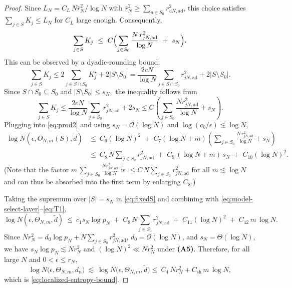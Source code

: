 \documentclass[11pt]{article}
\theoremstyle{plain}
\newtheorem{lemma}{Lemma}
\theoremstyle{definition}
\theoremstyle{plain}
\begin{document}
\begin{proof}
Since $L_N=C_L\,N\bar r_N^2/\log N$ with $\bar r_N^2\ge \sum_{u\in S_0}r_{uN,\mathrm{ad}}^2$, this choice satisfies $\sum_{j\in S}K_j\le L_N$ for $C_L$ large enough. Consequently,
\[
\sum_{j\in S}K_j\ \le\ C\Bigl(\sum_{j\in S_0}\frac{N\,r_{jN,\mathrm{ad}}^2}{\log N}\ +\ s_N\Bigr).
\]
This can be observed by a dyadic-rounding bound:
\[
\sum_{j \in S} K_j \le 2 \sum_{j \in S \cap S_0} K_j ^{\star} + 2|S \setminus S_0| =\frac{2cN}{\log N} \sum_{j \in S \cap S_0} r_{jN,\textrm{ad}} ^2 + 2|S\setminus S_0|.
\]
Since $S \cap S_0 \subseteq S_0$ and $|S \setminus S_0| \le s_N,$ the inequality follows from \[
\sum_{j \in S} K_j \le \frac{2cN}{\log N} \sum_{j \in S_0} r_{jN,\textrm{ad}}^2 + 2s_N \le C \left(\sum_{j \in S_0} \frac{N r_{jN,\textrm{ad}}^2}{\log N} + s_N \right).
\]
Plugging into \eqref{eq:prod2} and using $s_N=\mathcal{O}(\log N)$ and $\log(c_0/\epsilon)\lesssim\log N$,
\begin{align}
\log N(\epsilon,\Theta_{N,m}(S),\tilde d)
&\le\ C_6(\log N)^2\;+\; C_7(\log N + m)\left(\sum_{j\in S_0}\frac{N\,r_{jN,\mathrm{ad}}^2}{\log N} + s_N\right)\nonumber\\
&\le\ C_8\,N\sum_{j\in S_0}r_{jN,\mathrm{ad}}^2\;+\; C_9\,(\log N + m)\,s_N\;+\;C_{10}(\log N)^2.\label{eq:fixedS}
\end{align}
(Note that the factor $m\,\sum_{j\in S_0}\frac{N r_{jN,\mathrm{ad}}^2}{\log N}$ is $\le C\,N\sum_{j\in S_0}r_{jN,\mathrm{ad}}^2$ for all $m\lesssim \log N$ and can thus be absorbed into the first term by enlarging $C_8$.)

Taking the supremum over $|S|=s_N$ in \eqref{eq:fixedS} and combining with \eqref{eq:model-select-layer}--\eqref{eq:T1},
\[
\log N(\epsilon,\Theta_{N,m},\tilde d)
\ \le\ c_1 s_N\log p_N\;+\; C_8\,N\sum_{j\in S_0}r_{jN,\mathrm{ad}}^2\;+\; C_{11}(\log N)^2\;+\; C_{12}\,m\,\log N.
\]
Since $N r_N^2=d_0\log p_N+N\sum_{j\in S_0}r_{jN,\mathrm{ad}}^2$, $d_0 = \mathcal{O}(\log N)$, and $s_N=\Theta(\log N)$, we have $s_N\log p_N\lesssim N r_N^2$ and $(\log N)^2\ll N r_N^2$ under \textbf{(A5)}. Therefore, for all large $N$ and $0<\epsilon\le r_N$,
\[
\log N \bigl(\epsilon,\Theta_{N,m}, d_n \bigr)\ \lesssim\ \log N \bigl(\epsilon, \Theta_{N,m}, \tilde d \bigr)
\le\ C_4\,N r_N^2+C_{\mathrm{sh}}\,m\,\log N,
\]
which is \eqref{eq:localized-entropy-bound}.
\end{proof}


\end{document}
